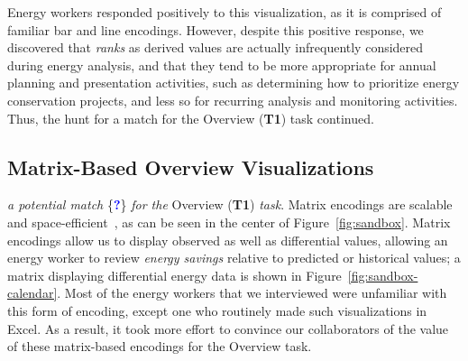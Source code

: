 \documentclass[journal]{vgtc}                %
\newcommand*\posmatch{\textcolor{blue}{{\bf ?}}}
\newcommand{\bstart}[1]{\vspace{1mm} \noindent{\textbf{#1:}}}
\newcommand{\jn}[1]{\textcolor{darkGreen}{#1}}
\begin{document}
Energy workers responded positively to this visualization, as it is comprised of familiar bar and line encodings. 
However, despite this positive response, we discovered that {\it ranks} as derived values are actually infrequently considered during energy analysis, and that they tend to be more appropriate for annual planning and presentation activities, such as determining how to prioritize energy conservation projects, and less so for recurring analysis and monitoring activities.
Thus, the hunt for a match for the Overview ({\bf T1}) task continued.


\subsection{Matrix-Based Overview Visualizations}
\label{design-matrix}


\bstart{Time series matrix} {\it a potential match} \{\posmatch\} {\it for the} Overview ({\bf T1}) {\it task}.
Matrix encodings are scalable and space-efficient~\cite{Goodwin2013,Hao2007}, as can be seen in the center of Figure~\ref{fig:sandbox}.
Matrix encodings allow us to display observed as well as differential values, allowing an energy worker to review {\it energy savings} relative to predicted or historical values; a matrix displaying differential energy data is shown in Figure~\ref{fig:sandbox-calendar}. 
Most of the energy workers that we interviewed were unfamiliar with this form of encoding, except one who routinely made such visualizations in Excel. 
As a result, it took more effort to convince our collaborators of the value of these matrix-based encodings for the Overview task.
\end{document}
